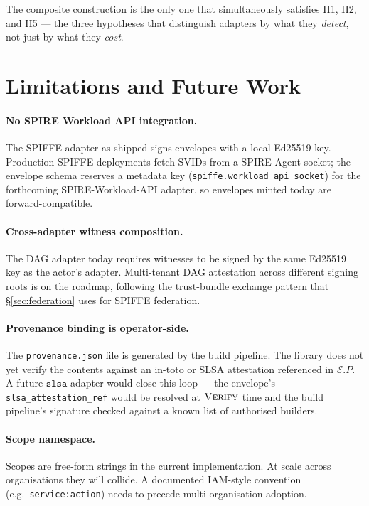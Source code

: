\documentclass[11pt,a4paper]{article}
\begin{document}
The composite construction is the only one that simultaneously
satisfies H1, H2, and H5 --- the three hypotheses that distinguish
adapters by what they \emph{detect}, not just by what they \emph{cost}.

\section{Limitations and Future Work}\label{sec:limits}

\paragraph{No SPIRE Workload API integration.} The SPIFFE adapter as
shipped signs envelopes with a local Ed25519 key. Production SPIFFE
deployments fetch SVIDs from a SPIRE Agent socket; the envelope schema
reserves a metadata key (\texttt{spiffe.workload\_api\_socket}) for the
forthcoming SPIRE-Workload-API adapter, so envelopes minted today are
forward-compatible.

\paragraph{Cross-adapter witness composition.} The DAG adapter today
requires witnesses to be signed by the same Ed25519 key as the actor's
adapter. Multi-tenant DAG attestation across different signing roots is
on the roadmap, following the trust-bundle exchange pattern that
\S\ref{sec:federation} uses for SPIFFE federation.

\paragraph{Provenance binding is operator-side.} The
\texttt{provenance.json} file is generated by the build pipeline. The
library does not yet verify the contents against an in-toto or SLSA
attestation referenced in $\mathcal{E}.P$. A future $\texttt{slsa}$
adapter would close this loop --- the envelope's
\texttt{slsa\_attestation\_ref} would be resolved at $\textsc{Verify}$
time and the build pipeline's signature checked against a known list of
authorised builders.

\paragraph{Scope namespace.} Scopes are free-form strings in the
current implementation. At scale across organisations they will collide.
A documented IAM-style convention (e.g.\ \texttt{service:action}) needs
to precede multi-organisation adoption.
\end{document}
